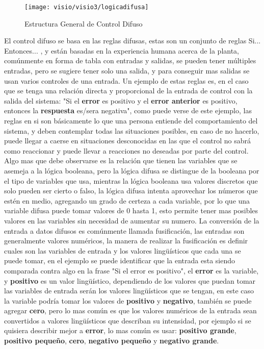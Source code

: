 \begin{figure}[h]
	\centering
	\texttt{[image: visio/visio3/logicadifusa]}
	\caption{Estructura General de Control Difuso}
	\label{fig:logicadifusa}
\end{figure}

El control difuso se basa en las reglas difusas, estas son un conjunto de reglas Si... Entonces... , y están basadas en la experiencia humana acerca de la planta, comúnmente en forma de tabla con entradas y salidas, se pueden tener múltiples entradas, pero se sugiere tener solo una salida, y para conseguir mas salidas se usan varios controles de una entrada. Un ejemplo de estas reglas es, en el caso que se tenga una relación directa y proporcional de la entrada de control con la salida del sistema: "Si el \textbf{error} es positivo y el \textbf{error anterior} es positivo, entonces la \textbf{respuesta} es/sera negativa", como puede verse de este ejemplo, las reglas en si son básicamente lo que una persona entiende del comportamiento del sistema, y deben contemplar todas las situaciones posibles, en caso de no hacerlo, puede llegar a caerse en situaciones desconocidas en las que el control no sabrá como reaccionar y puede llevar a reacciones no deseadas por parte del control. Algo mas que debe observarse es la relación que tienen las variables que se asemeja a la lógica booleana, pero la lógica difusa se distingue de la booleana por el tipo de variables que usa, mientras la lógica booleana usa valores discretos que solo pueden ser cierto o falso, la lógica difusa intenta aprovechar los números que estén en medio, agregando un grado de certeza a cada variable, por lo que una variable difusa puede tomar valores de 0 hasta 1, esto permite tener mas posibles valores en las variables sin necesidad de aumentar su numero.
La conversión de la entrada a datos difusos es comúnmente llamada  fusificación, las entradas son generalmente valores numéricos, la manera de realizar la fusificación es definir cuales son las variables de entrada y los valores lingüísticos que cada una se puede tomar, en el ejemplo se puede identificar que la entrada esta siendo comparada contra algo en la frase "Si el error es positivo", el \textbf{error} es la variable, y \textbf{positivo} es un valor lingüístico, dependiendo de los valores que puedan tomar las variables de entrada serán los valores lingüísticos que se tengan, en este caso la variable podría tomar los valores de \textbf{positivo} y \textbf{negativo}, también se puede agregar \textbf{cero}, pero lo mas común es que los valores numéricos de la entrada sean convertidos a valores lingüísticos que describan su intensidad, por ejemplo si se quisiera describir mejor a \textbf{error}, lo mas común es usar: \textbf{positivo grande},  \textbf{positivo pequeño}, \textbf{cero}, \textbf{negativo pequeño} y \textbf{negativo grande}. 
